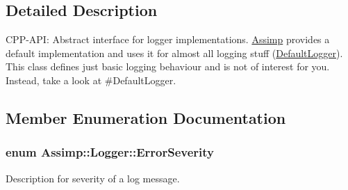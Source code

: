 \subsection{Detailed Description}
C\+P\+P-\/\+A\+PI\+: Abstract interface for logger implementations. \hyperlink{namespace_assimp}{Assimp} provides a default implementation and uses it for almost all logging stuff (\textquotesingle{}\hyperlink{class_assimp_1_1_default_logger}{Default\+Logger}\textquotesingle{}). This class defines just basic logging behaviour and is not of interest for you. Instead, take a look at \#\+Default\+Logger. 

\subsection{Member Enumeration Documentation}
\subsubsection[{\texorpdfstring{Error\+Severity}{ErrorSeverity}}]{\setlength{\rightskip}{0pt plus 5cm}enum {\bf Assimp\+::\+Logger\+::\+Error\+Severity}}\hypertarget{class_assimp_1_1_logger_acd0b52a87d6fc11e957ed2c6e2ad75b6}{}\label{class_assimp_1_1_logger_acd0b52a87d6fc11e957ed2c6e2ad75b6}


Description for severity of a log message. 

